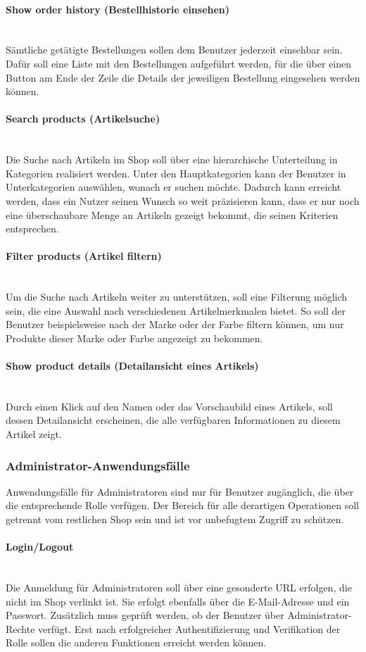 \paragraph{Show order history (Bestellhistorie einsehen)}$\;$ \\
Sämtliche getätigte Bestellungen sollen dem Benutzer jederzeit einsehbar sein.
Dafür soll eine Liste mit den Bestellungen aufgeführt werden, für die über einen Button am Ende der Zeile die Details der jeweiligen Bestellung eingesehen werden können.
\paragraph{Search products (Artikelsuche)}$\;$ \\
Die Suche nach Artikeln im Shop soll über eine hierarchische Unterteilung in Kategorien realisiert werden.
Unter den Hauptkategorien kann der Benutzer in Unterkategorien auswählen, wonach er suchen möchte.
Dadurch kann erreicht werden, dass ein Nutzer seinen Wunsch so weit präzisieren kann, dass er nur noch eine überschaubare Menge an Artikeln gezeigt bekommt, die seinen Kriterien entsprechen.
\paragraph{Filter products (Artikel filtern)}$\;$ \\
Um die Suche nach Artikeln weiter zu unterstützen, soll eine Filterung möglich sein, die eine Auswahl nach verschiedenen Artikelmerkmalen bietet.
So soll der Benutzer beispielsweise nach der Marke oder der Farbe filtern können, um nur Produkte dieser Marke oder Farbe angezeigt zu bekommen.
\paragraph{Show product details (Detailansicht eines Artikels)}$\;$ \\
Durch einen Klick auf den Namen oder das Vorschaubild eines Artikels, soll dessen Detailansicht erscheinen, die alle verfügbaren Informationen zu diesem Artikel zeigt.
\subsubsection{Administrator-Anwendungsfälle}
Anwendungsfälle für Administratoren sind nur für Benutzer zugänglich, die über die entsprechende Rolle verfügen.
Der Bereich für alle derartigen Operationen soll getrennt vom restlichen Shop sein und ist vor unbefugtem Zugriff zu schützen.
\paragraph{Login/Logout}$\;$ \\
Die Anmeldung für Administratoren soll über eine gesonderte URL erfolgen, die nicht im Shop verlinkt ist.
Sie erfolgt ebenfalls über die E-Mail-Adresse und ein Passwort. Zusätzlich muss geprüft werden, ob der Benutzer über Administrator-Rechte verfügt.
Erst nach erfolgreicher Authentifizierung und Verifikation der Rolle sollen die anderen Funktionen erreicht werden können.

